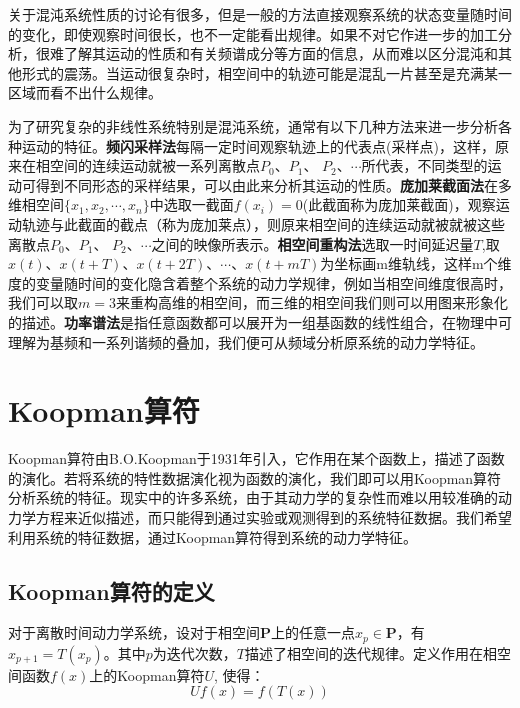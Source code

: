 关于混沌系统性质的讨论有很多，但是一般的方法直接观察系统的状态变量随时间的变化，即使观察时间很长，也不一定能看出规律。如果不对它作进一步的加工分析，很难了解其运动的性质和有关频谱成分等方面的信息，从而难以区分混沌和其他形式的震荡。当运动很复杂时，相空间中的轨迹可能是混乱一片甚至是充满某一区域而看不出什么规律。

为了研究复杂的非线性系统特别是混沌系统，通常有以下几种方法来进一步分析各种运动的特征\cite{liuyanqing2000non}。\textbf{频闪采样法}每隔一定时间观察轨迹上的代表点(采样点)，这样，原来在相空间的连续运动就被一系列离散点$P_0$、$P_1$、
$P_2$、$\cdots$所代表，不同类型的运动可得到不同形态的采样结果，可以由此来分析其运动的性质。\textbf{庞加莱截面法}\cite{viswanath2001lindstedt}在多维相空间$\{x_1,x_2,\cdots,x_n\}$中选取一截面$f(x_i)=0$(此截面称为庞加莱截面)，观察运动轨迹与此截面的截点（称为庞加莱点），则原来相空间的连续运动就被就被这些离散点$P_0$、$P_1$、
$P_2$、$\cdots$之间的映像所表示。\textbf{相空间重构法}\cite{antoniou1999time}选取一时间延迟量$T$,取$x(t)$、$x(t+T)$、$x(t+2T)$、$\cdots$、$x(t+mT)$为坐标画m维轨线，这样m个维度的变量随时间的变化隐含着整个系统的动力学规律，例如当相空间维度很高时，我们可以取$m=3$来重构高维的相空间，而三维的相空间我们则可以用图来形象化的描述。\textbf{功率谱法}是指任意函数都可以展开为一组基函数的线性组合，在物理中可理解为基频和一系列谐频的叠加，我们便可从频域分析原系统的动力学特征。



\section{Koopman算符}
Koopman算符由B.O.Koopman于1931年引入\cite{koopman1931hamiltonian}，它作用在某个函数上，描述了函数的演化。若将系统的特性数据演化视为函数的演化，我们即可以用Koopman算符分析系统的特征。现实中的许多系统，由于其动力学的复杂性而难以用较准确的动力学方程来近似描述，而只能得到通过实验或观测得到的系统特征数据。我们希望利用系统的特征数据，通过Koopman算符得到系统的动力学特征。

\subsection{Koopman算符的定义}
对于离散时间动力学系统，设对于相空间$\mathbf{P}$上的任意一点$x_p\in \mathbf{P}$，有$x_{p+1}=T(x_p)$。其中$p$为迭代次数，$T$描述了相空间的迭代规律。定义作用在相空间函数$f(x)$上的Koopman算符$U$, 使得：
\begin{equation}
    Uf(x)=f(T(x))
\end{equation}

